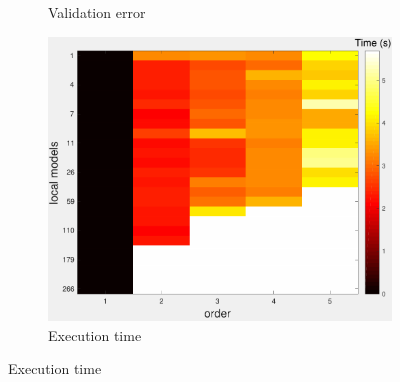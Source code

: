 \documentclass[letterpaper, 10 pt, conference]{ieeeconf}  %
\begin{document}
\begin{figure}[htpb]
\begin{subfigure}[b]{1in}
                \caption{Validation error}
                \label{fig:crossval_train}
        \end{subfigure}
                \begin{subfigure}[b]{1in} 
                \centering
                \includegraphics[width=\textwidth]{figures/cross_allreg3.pdf}
                \caption{Execution time}
                \label{fig:crossval_train}
        \end{subfigure}
\end{figure}
\blindtext[1]
\end{document}
